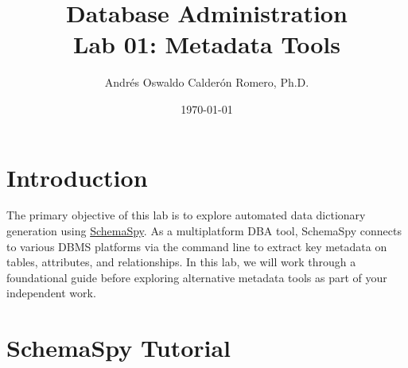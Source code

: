 \documentclass{article}
\title{Database Administration \\ Lab 01: Metadata Tools}
\author{Andrés Oswaldo Calderón Romero, Ph.D.}
\date{\today}
\begin{document}
\maketitle

\section{Introduction}
The primary objective of this lab is to explore automated data dictionary generation using \href{https://schemaspy.org/}{SchemaSpy}. As a multiplatform DBA tool, SchemaSpy connects to various DBMS platforms via the command line to extract key metadata on tables, attributes, and relationships. In this lab, we will work through a foundational guide before exploring alternative metadata tools as part of your independent work.

\section{SchemaSpy Tutorial}
\end{document}
